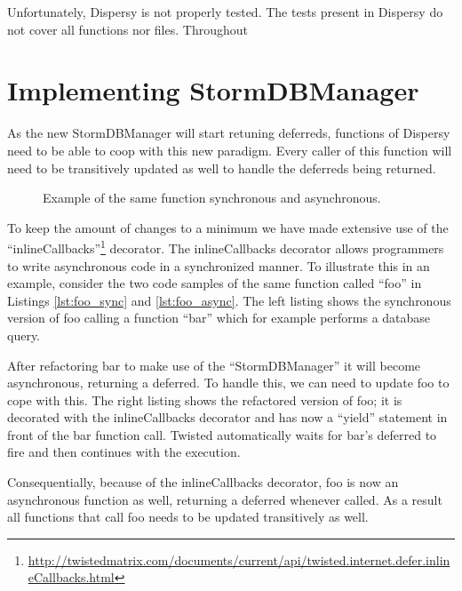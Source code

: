 Unfortunately, Dispersy is not properly tested.
The tests present in Dispersy do not cover all functions nor files.
Throughout 

\section{Implementing StormDBManager}

As the new StormDBManager will start retuning deferreds, functions of Dispersy need to be able to coop with this new paradigm.
Every caller of this function will need to be transitively updated as well to handle the deferreds being returned.

\begin{figure}[h]
	\begin{subfigure}[b]{.5\linewidth}
		
	\end{subfigure}
	\begin{subfigure}[b]{.5\linewidth}
		
	\end{subfigure}
	\caption*{Example of the same function synchronous and asynchronous.}
\end{figure}

To keep the amount of changes to a minimum we have made extensive use of the \enquote{inlineCallbacks}\footnote{\url{http://twistedmatrix.com/documents/current/api/twisted.internet.defer.inlineCallbacks.html}} decorator.
The inlineCallbacks decorator allows programmers to write asynchronous code in a synchronized manner.
To illustrate this in an example, consider the two code samples of the same function called \enquote{foo} in Listings \ref{lst:foo_sync} and \ref{lst:foo_async}.
The left listing shows the synchronous version of foo calling a function \enquote{bar} which for example performs a database query.

After refactoring bar to make use of the \enquote{StormDBManager} it will become asynchronous, returning a deferred.
To handle this, we can need to update foo to cope with this.
The right listing shows the refactored version of foo; it is decorated with the inlineCallbacks decorator and has now a \enquote{yield} statement in front of the bar function call.
Twisted automatically waits for bar's deferred to fire and then continues with the execution.

Consequentially, because of the inlineCallbacks decorator, foo is now an asynchronous function as well, returning a deferred whenever called.
As a result all functions that call foo needs to be updated transitively as well.

